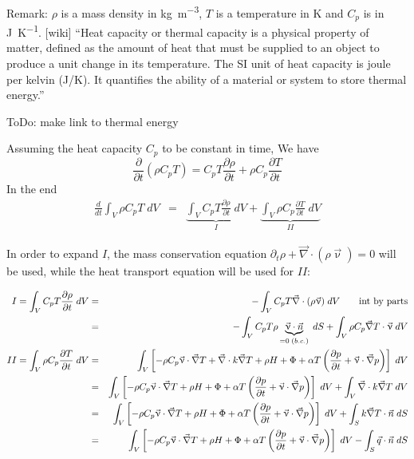 Remark: $\rho$ is a mass density in \si{\kg\per\cubic\meter},
$T$ is a temperature in \si{\kelvin} and $C_p$ is in \si{\joule\per\kelvin}.
[wiki] ``Heat capacity or thermal capacity is a physical property of matter, defined as 
the amount of heat that must be supplied to an object to produce a unit change in its 
temperature. The SI unit of heat capacity is joule per kelvin (J/K). 
It quantifies the ability of a material or system to store thermal energy.''

{\color{red} ToDo: make link to thermal energy}

Assuming the heat capacity $C_p$ to be constant in time, We have 
\[
\frac{\partial }{\partial t} (\rho C_p T ) 
= C_p T \frac{\partial \rho}{\partial t} + \rho C_p \frac{\partial T}{\partial t} 
\]
In the end
\begin{eqnarray}
\frac{d}{dt} \int_V \rho C_p T \; dV 
&=& \underbrace{\int_V C_p T \frac{\partial \rho}{\partial t} \; dV}_{I} 
+ \underbrace{\int_V \rho C_p \frac{\partial T}{\partial t} \; dV }_{II}
\end{eqnarray}

In order to expand $I$, the mass conservation equation $\partial_t \rho + \vec\nabla\cdot(\rho \vec\upnu)=0$ will be used, 
while the heat transport equation will be used for $II$:

\begin{eqnarray}
I= \int_V C_p T \frac{\partial \rho}{\partial t} \; dV
&=& -\int_V C_p T {\vec\nabla} \cdot (\rho \vec{\upnu}) \; dV \qquad \text{int by parts} \nonumber\\
&=& -\int_V C_p T \rho \underbrace{ \vec{\upnu} \cdot \vec{n}}_{=0 \; (b.c.)} \; dS 
+  \int_V \rho C_p  \vec{\nabla}  T \cdot \vec{\upnu} \; dV
\\
II=\int_V \rho C_p \frac{\partial T}{\partial t}  \; dV
&=&  \int_V \left[ -\rho C_p \vec{\upnu}\cdot \vec{\nabla}T 
+{\vec\nabla}\cdot k {\vec\nabla} T + \rho H  + \Phi    
+\alpha T \left( \frac{\partial p}{\partial t}+  \vec\upnu \cdot {\vec\nabla} 
p \right) \right] \;  dV \nonumber\\ 
&=& 
 \int_V \left[ -\rho C_p \vec{\upnu}\cdot \vec{\nabla}T 
+ \rho H  + \Phi    +\alpha T \left( \frac{\partial p}{\partial t}
+ \vec\upnu \cdot {\vec\nabla} p \right) \right] \; dV 
+ \int_V {\vec\nabla}\cdot k {\vec\nabla} T \; dV \nonumber\\ 
&=& 
 \int_V \left[ -\rho C_p \vec{\upnu}\cdot {\vec\nabla}T 
+ \rho H  + \Phi    +\alpha T \left( \frac{\partial p}{\partial t}
+ \vec\upnu \cdot \vec{\nabla} p \right) \right] \; dV 
+ \int_S  k \vec{\nabla} T \cdot \vec{n} \;  dS \nonumber\\ 
&=& 
 \int_V \left[ -\rho C_p \vec{\upnu} \cdot \vec{\nabla}T 
+ \rho H  + \Phi    +\alpha T \left( \frac{\partial p}{\partial t}+  
\vec\upnu  \cdot \vec{\nabla} p \right) \right]  \;  dV 
- \int_S  \vec{q} \cdot \vec{n} \; dS  \nonumber
\label{ba004}
\end{eqnarray}

